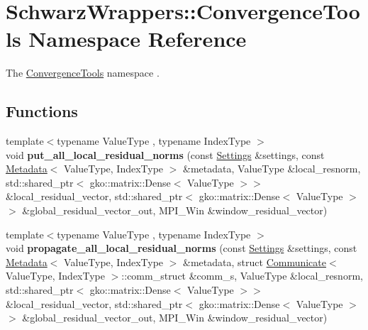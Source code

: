 \hypertarget{namespaceSchwarzWrappers_1_1ConvergenceTools}{}\section{Schwarz\+Wrappers\+:\+:Convergence\+Tools Namespace Reference}
\label{namespaceSchwarzWrappers_1_1ConvergenceTools}


The \hyperlink{namespaceSchwarzWrappers_1_1ConvergenceTools}{Convergence\+Tools} namespace .  


\subsection*{Functions}
\begin{DoxyCompactItemize}
\item 
\mbox{\label{namespaceSchwarzWrappers_1_1ConvergenceTools_ae72ff932e1c374c8e77c997414a3fc85}} 
{\footnotesize template$<$typename Value\+Type , typename Index\+Type $>$ }\\void {\bfseries put\+\_\+all\+\_\+local\+\_\+residual\+\_\+norms} (const \hyperlink{structSchwarzWrappers_1_1Settings}{Settings} \&settings, const \hyperlink{structSchwarzWrappers_1_1Metadata}{Metadata}$<$ Value\+Type, Index\+Type $>$ \&metadata, Value\+Type \&local\+\_\+resnorm, std\+::shared\+\_\+ptr$<$ gko\+::matrix\+::\+Dense$<$ Value\+Type $>$$>$ \&local\+\_\+residual\+\_\+vector, std\+::shared\+\_\+ptr$<$ gko\+::matrix\+::\+Dense$<$ Value\+Type $>$$>$ \&global\+\_\+residual\+\_\+vector\+\_\+out, M\+P\+I\+\_\+\+Win \&window\+\_\+residual\+\_\+vector)
\item 
\mbox{\label{namespaceSchwarzWrappers_1_1ConvergenceTools_a718521115937438b471adc63289446b8}} 
{\footnotesize template$<$typename Value\+Type , typename Index\+Type $>$ }\\void {\bfseries propagate\+\_\+all\+\_\+local\+\_\+residual\+\_\+norms} (const \hyperlink{structSchwarzWrappers_1_1Settings}{Settings} \&settings, const \hyperlink{structSchwarzWrappers_1_1Metadata}{Metadata}$<$ Value\+Type, Index\+Type $>$ \&metadata, struct \hyperlink{classSchwarzWrappers_1_1Communicate}{Communicate}$<$ Value\+Type, Index\+Type $>$\+::comm\+\_\+struct \&comm\+\_\+s, Value\+Type \&local\+\_\+resnorm, std\+::shared\+\_\+ptr$<$ gko\+::matrix\+::\+Dense$<$ Value\+Type $>$$>$ \&local\+\_\+residual\+\_\+vector, std\+::shared\+\_\+ptr$<$ gko\+::matrix\+::\+Dense$<$ Value\+Type $>$$>$ \&global\+\_\+residual\+\_\+vector\+\_\+out, M\+P\+I\+\_\+\+Win \&window\+\_\+residual\+\_\+vector)

\end{DoxyCompactItemize}

